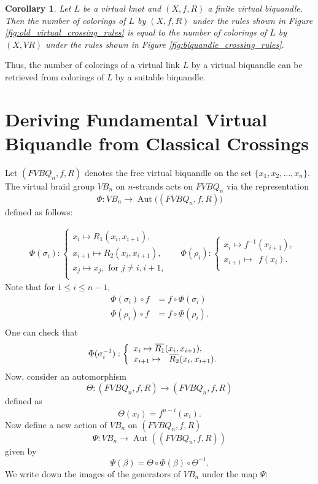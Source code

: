 \documentclass[11pt, reqno]{amsart}
\newtheorem{corollary}[theorem]{Corollary}
\theoremstyle{definition}
\newcommand{\Aut}{\operatorname{Aut}}
\newcommand{\overbar}[1]{\mkern 1.5mu\overline{\mkern-1.5mu#1\mkern-1.5mu}\mkern 1.5mu}
\begin{document}
\begin{corollary}\label{cor:cor_number_of_colorings_are_same}
Let $L$ be a virtual knot and $(X,f,R)$ a finite virtual biquandle. Then the number of colorings of $L$ by $(X,f,R)$ under the rules shown in Figure \ref{fig:old_virtual_crossing_rules} is equal to the number of colorings of $L$ by $(X, VR)$ under the rules shown in Figure \ref{fig:biquandle_crossing_rules}.
\end{corollary}

Thus, the number of colorings of a virtual link $L$ by a virtual biquandle can be retrieved from  colorings of $L$ by a suitable biquandle.
\section{Deriving Fundamental Virtual Biquandle from Classical Crossings}\label{Relation}

Let $(FVBQ_n,f,R)$ denotes the free virtual biquandle on the set $\{x_1, x_2, \ldots, x_n\}$. The virtual braid group $VB_n$ on $n$-strands acts on $FVBQ_n$ via the representation $$\Phi: VB_n \to \Aut\big((FVBQ_n, f, R)\big)$$ defined as follows:

\begin{align*}
	&\Phi(\sigma_i) :
	\left\{
	\begin{array}{l}
		x_i \mapsto  R_1(x_i,x_{i+1}), \\
		x_{i+1} \mapsto R_2(x_i,x_{i+1}),  \\
		x_j \mapsto x_j, \textrm{ for } j \neq i, i+1, \\
	\end{array}
	\right.~~~
	&\Phi(\rho_i) :
	\left\{
	\begin{array}{l}
		x_i \mapsto  f^{-1}(x_{i+1}), \\
		x_{i+1} \mapsto ~~f(x_i). \\
	\end{array}
	\right.
\end{align*}
Note that  for $1 \leq i \leq n-1$,
\begin{align*}
\Phi(\sigma_{i}) \circ f &= f \circ \Phi(\sigma_{i})\\
\Phi(\rho_{i}) \circ f&=f \circ \Phi(\rho_{i}).\\
\end{align*}
One can check that
\begin{align*}
&\Phi(\sigma_i^{-1}) :
	\left\{	\begin{array}{l}
		x_i \mapsto  \overbar{R_1}(x_i,x_{i+1}), \\
		x_{i+1} \mapsto ~~\overbar{R_2}(x_i,x_{i+1}). \\
	\end{array}
\right.
\end{align*}
Now, consider an automorphism $$\Theta: (FVBQ_n, f, R) \to (FVBQ_n, f, R)$$ defined as $$\Theta(x_i)=f^{n-i}(x_i).$$
Now define a new action of $VB_n$ on $(FVBQ_n, f,R)$ $$\Psi: VB_n \to \Aut((FVBQ_n, f,R))$$ given by $$\Psi(\beta)= \Theta \circ \Phi (\beta) \circ \Theta^{-1}.$$ We write down the images of the generators of $VB_n$ under the map $\Psi$:
\end{document}
